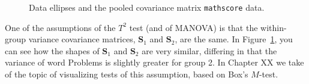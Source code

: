 \documentclass[
  letterpaper,
  10pt,
  krantz2]{krantz}
\makeatletter
\newenvironment{Shaded}{\begin{snugshade}}{\end{snugshade}}
\newcommand{\AttributeTok}[1]{\textcolor[rgb]{0.40,0.45,0.13}{#1}}
\newcommand{\ConstantTok}[1]{\textcolor[rgb]{0.56,0.35,0.01}{#1}}
\newcommand{\DecValTok}[1]{\textcolor[rgb]{0.68,0.00,0.00}{#1}}
\newcommand{\FloatTok}[1]{\textcolor[rgb]{0.68,0.00,0.00}{#1}}
\newcommand{\FunctionTok}[1]{\textcolor[rgb]{0.28,0.35,0.67}{#1}}
\newcommand{\NormalTok}[1]{\textcolor[rgb]{0.00,0.23,0.31}{#1}}
\newcommand{\SpecialCharTok}[1]{\textcolor[rgb]{0.37,0.37,0.37}{#1}}
\newcommand{\StringTok}[1]{\textcolor[rgb]{0.13,0.47,0.30}{#1}}
\newenvironment{kframe}{%
  \medskip{}
  \setlength{\fboxsep}{.8em}
  \def\at@end@of@kframe{}%
  \ifinner\ifhmode%
  \def\at@end@of@kframe{\end{minipage}}%
  \begin{minipage}{\columnwidth}%
  \fi\fi%
  \def\FrameCommand##1{\hskip\@totalleftmargin \hskip-\fboxsep
  \colorbox{shadecolor}{##1}\hskip-\fboxsep
      \hskip-\linewidth \hskip-\@totalleftmargin \hskip\columnwidth}%
  \MakeFramed {\advance\hsize-\width
    \@totalleftmargin\z@ \linewidth\hsize
    \@setminipage}}%
{\par\unskip\endMakeFramed%
  \at@end@of@kframe}
\renewenvironment{Shaded}{\begin{kframe}}{\end{kframe}}
\makeatother
\begin{document}
\begin{Shaded}
\end{Shaded}

\begin{figure}[H]


\caption{\label{fig-mathscore-cov2}Data ellipses and the pooled
covariance matrix \texttt{mathscore} data.}

\end{figure}%

One of the assumptions of the \(T^2\) test (and of MANOVA) is that the
within-group variance covariance matrices, \(\mathbf{S}_1\) and
\(\mathbf{S}_2\), are the same. In Figure~\ref{fig-mathscore-cov2}, you
can see how the shapes of \(\mathbf{S}_1\) and \(\mathbf{S}_2\) are very
similar, differing in that the variance of word Problems is slightly
greater for group 2. In Chapter XX we take of the topic of visualizing
tests of this assumption, based on Box's \(M\)-test.
\end{document}

